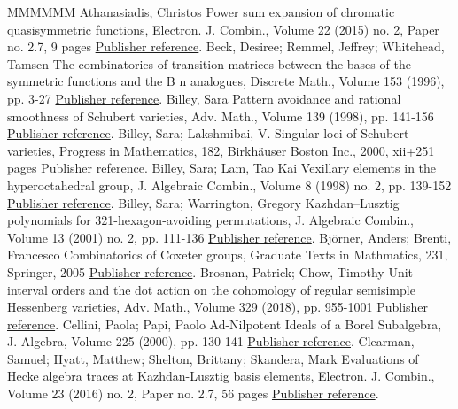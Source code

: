 \documentclass[11pt]{article}
\theoremstyle{definition}
\numberwithin{equation}{section}
\begin{document}
\begin{thebibliography}{MMMMMM}
 Athanasiadis, Christos Power sum expansion of chromatic quasisymmetric functions, Electron. J. Combin., Volume 22 (2015) no. 2, Paper no. 2.7, 9 pages \href{https://alco.centre-mersenne.org/articles/10.5802/alco.459/#AthanPSE}{Publisher reference}.
 Beck, Desiree; Remmel, Jeffrey; Whitehead, Tamsen The combinatorics of transition matrices between the bases of the symmetric functions and the B n  analogues, Discrete Math., Volume 153 (1996), pp. 3-27 \href{https://alco.centre-mersenne.org/articles/10.5802/alco.459/#RemTrans}{Publisher reference}.
 Billey, Sara Pattern avoidance and rational smoothness of Schubert varieties, Adv. Math., Volume 139 (1998), pp. 141-156 \href{https://alco.centre-mersenne.org/articles/10.5802/alco.459/#BilleyPattern}{Publisher reference}.
 Billey, Sara; Lakshmibai, V. Singular loci of Schubert varieties, Progress in Mathematics, 182, Birkhäuser Boston Inc., 2000, xii+251 pages \href{https://alco.centre-mersenne.org/articles/10.5802/alco.459/#BilleyLak}{Publisher reference}.
 Billey, Sara; Lam, Tao Kai Vexillary elements in the hyperoctahedral group, J. Algebraic Combin., Volume 8 (1998) no. 2, pp. 139-152 \href{https://alco.centre-mersenne.org/articles/10.5802/alco.459/#BilleyLamVex}{Publisher reference}.
 Billey, Sara; Warrington, Gregory Kazhdan–Lusztig polynomials for 321-hexagon-avoiding permutations, J. Algebraic Combin., Volume 13 (2001) no. 2, pp. 111-136 \href{https://alco.centre-mersenne.org/articles/10.5802/alco.459/#BWHex}{Publisher reference}.
 Björner, Anders; Brenti, Francesco Combinatorics of Coxeter groups, Graduate Texts in Mathmatics, 231, Springer, 2005 \href{https://alco.centre-mersenne.org/articles/10.5802/alco.459/#BBCoxeter}{Publisher reference}.
 Brosnan, Patrick; Chow, Timothy Unit interval orders and the dot action on the cohomology of regular semisimple Hessenberg varieties, Adv. Math., Volume 329 (2018), pp. 955-1001 \href{https://alco.centre-mersenne.org/articles/10.5802/alco.459/#BChowUIODot}{Publisher reference}.
 Cellini, Paola; Papi, Paolo Ad-Nilpotent Ideals of a Borel Subalgebra, J. Algebra, Volume 225 (2000), pp. 130-141 \href{https://alco.centre-mersenne.org/articles/10.5802/alco.459/#CelliniPapi}{Publisher reference}.
 Clearman, Samuel; Hyatt, Matthew; Shelton, Brittany; Skandera, Mark Evaluations of Hecke algebra traces at Kazhdan-Lusztig basis elements, Electron. J. Combin., Volume 23 (2016) no. 2, Paper no. 2.7, 56 pages \href{https://alco.centre-mersenne.org/articles/10.5802/alco.459/#CHSSkanEKL}{Publisher reference}.

\end{thebibliography}
\end{document}
